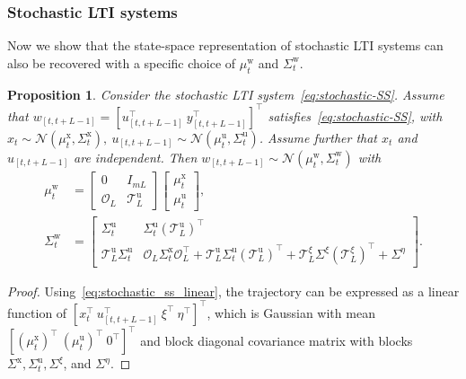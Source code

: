 \documentclass[letterpaper, 10 pt, conference]{ieeeconf}
\def\mw{\mu^\mathrm{w}_t}
\def\Sw{\Sigma^\mathrm{w}}
\newtheorem{prop}{Proposition}
\begin{document}
\subsubsection{Stochastic \gls{LTI} systems}
Now we show that the state-space representation of stochastic \gls{LTI} systems can also be recovered with a specific choice of $\mw$ and $\Sw_t$.
\begin{prop} \label{prop:SS_stochastic_equivalence}
Consider the stochastic \gls{LTI} system~\eqref{eq:stochastic-SS}.
Assume that $w_{[t,t+L-1]}=[u_{[t,t+L-1]}^\top~y_{[t,t+L-1]}^\top]^\top$ satisfies~\eqref{eq:stochastic-SS}, with $x_t \sim \mathcal{N}(\mu^\mathrm{x}_t,\Sigma^\mathrm{x}_t),~u_{[t,t+L-1]}\sim\mathcal{N}(\mu^\mathrm{u}_t,\Sigma^\mathrm{u}_t)$.
Assume further that $x_t$ and $u_{[t,t+L-1]}$ are independent.
Then $w_{[t,t+L-1]} \sim \mathcal{N}(\mw,\Sw_t)$ with
\small
\begin{align*}
        \mw & = \begin{bmatrix}
            0 & I_{mL} \\ \mathcal{O}_L & \mathcal{T}_L^\mathrm{u}
        \end{bmatrix} 
        \begin{bmatrix}
             \mu^\mathrm{x}_t \\ \mu^\mathrm{u}_t
        \end{bmatrix}, \\
        \Sw_t & = \begin{bmatrix}
            \Sigma^\mathrm{u}_t & \Sigma^\mathrm{u}_t (\mathcal{T}_L^\mathrm{u})^\top \\
            \mathcal{T}_L^\mathrm{u}\Sigma^\mathrm{u}_t & \mathcal{O}_L\Sigma^\mathrm{x}_t\mathcal{O}_L^\top + \mathcal{T}_L^\mathrm{u}\Sigma^\mathrm{u}_t(\mathcal{T}_L^\mathrm{u})^\top + \mathcal{T}_L^\xi\Sigma^\xi(\mathcal{T}_L^\xi)^\top + \Sigma^\eta
        \end{bmatrix}.
\end{align*}
\normalsize
\end{prop}
\vspace{2mm}
\begin{proof}
    Using~\eqref{eq:stochastic_ss_linear}, the trajectory can be expressed as a linear function of $[x_t^\top~ u_{[t,t+L-1]}^\top~\xi^\top~\eta^\top]^\top$, which is
    Gaussian with mean $[(\mu^\mathrm{x}_t)^\top~(\mu^\mathrm{u}_t)^\top~0^\top]^\top$ and block diagonal covariance matrix with blocks $\Sigma^\mathrm{x},\Sigma^\mathrm{u}_t,\Sigma^\xi$, and $\Sigma^\eta$.
\end{proof}
\end{document}
